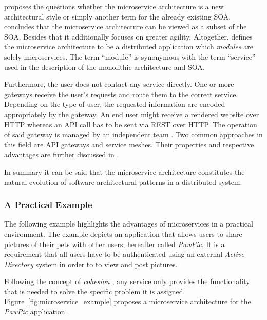 \autocite{VillamizarEvaluatingmonolithicmicroservice2015} proposes the
questions whether the microservice architecture is a new architectural style or
simply another term for the already existing \ac{SOA}.
\autocite{VillamizarEvaluatingmonolithicmicroservice2015} concludes that the
microservice architecture can be viewed as a subset of the \ac{SOA}. Besides
that it additionally focuses on greater agility. Altogether,
\autocite{DragoniMicroservicesyesterdaytoday2016} defines the microservice
architecture to be a distributed application which \textit{modules} are solely
microservices. The term \enquote{module} is synonymous with the term
\enquote{service} used in the description of the monolithic architecture and
\ac{SOA}.

Furthermore, the user does not contact any service directly. One or more
gateways receive the user's requests and route them to the correct service.
Depending on the type of user, the requested information are encoded
appropriately by the gateway. An end user might receive a rendered website over
\ac{HTTP} whereas an \ac{API} call has to be sent via \ac{REST} over \ac{HTTP}.
The operation of said gateway is managed by an independent team \autocite[p.
585]{VillamizarEvaluatingmonolithicmicroservice2015}. Two common approaches in
this field are \ac{API} gateways and service meshes. Their properties and
respective advantages are further discussed in
\autocite{HariharaSubramanianHandsRESTfulAPI2019}.

In summary it can be said that the microservice architecture constitutes the
natural evolution of software architectural patterns in a distributed system.

\subsubsection{A Practical Example}%
\label{ssub:A_Practical_Example}

The following example highlights the advantages of microservices in a practical
environment. The example depicts an application that allows users to share
pictures of their pets with other users; hereafter called \textit{PawPic}.
It is a requirement that all users have to be authenticated using an external
\textit{Active Directory} system in order to to view and post pictures.

Following the concept of \textit{cohesion} \autocite[p.
2]{DragoniMicroservicesyesterdaytoday2016}, any service only provides the
functionality that is needed to solve the specific problem it is assigned.
Figure~\ref{fig:microservice_example} proposes a microservice architecture for
the \textit{PawPic} application.

